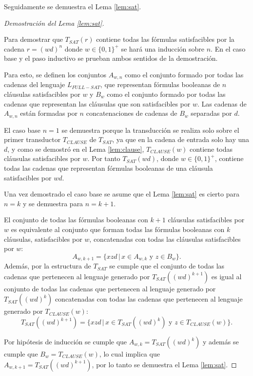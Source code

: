 \documentclass[12pt]{article}
\begin{document}
Seguidamente se demuestra el Lema \ref{lem:sat}.

\begin{proof}[Demostración del Lema \ref{lem:sat}] \
    
    Para demostrar que $T_{SAT}(r)$ contiene todas las fórmulas satisfacibles por la cadena $r=(wd)^n$ donde $w\in\{0,1\}^+$ se hará una inducción sobre $n$. En el caso base y el paso inductivo
    se prueban ambos sentidos de la demostración.  
    
    Para esto, se definen los conjuntos $A_{w,n}$ como el conjunto formado por todas las cadenas del lenguaje $L_{FULL-SAT}$, que representan fórmulas booleanas de $n$ cláusulas satisfacibles por $w$ y $B_w$ como el conjunto formado por todas las cadenas que representan las cláusulas que son satisfacibles por $w$. Las cadenas de $A_{w,n}$ están formadas por $n$ concatenaciones de cadenas de $B_w$ separadas por $d$.
    
    El caso base $n=1$ se demuestra porque la transducción se realiza solo sobre el primer transductor $T_{CLAUSE}$ de $T_{SAT}$, ya que en la cadena de entrada solo hay una $d$, y como se demostró en el Lema \ref{lem:clause}, $T_{CLAUSE}(w)$ contiene todas cláusulas satisfacibles por $w$. Por tanto $T_{SAT}(wd)$, donde $w\in \{0,1\}^+$, contiene todas las cadenas que representan fórmulas booleanas de una cláusula satisfacibles por $wd$.
    
    Una vez demostrado el caso base se asume que el Lema \ref{lem:sat} es cierto para $n=k$ y se demuestra para $n=k+1$.
    
    El conjunto de todas las fórmulas booleanas con $k+1$ cláusulas satisfacibles por $w$ es equivalente al conjunto que forman todas las fórmulas booleanas con $k$ cláusulas, satisfacibles por $w$, concatenadas con todas las cláusulas satisfacibles por $w$: $$A_{w,k+1}=\{xzd\,|\,x\in A_{w,k} \text{ y } z\in B_w\}.$$ Además, por la estructura de $T_{SAT}$ se cumple que el conjunto de todas las cadenas que pertenecen al lenguaje generado por $T_{SAT}((wd)^{k+1})$ es igual al conjunto de todas las cadenas que pertenecen al lenguaje generado por $T_{SAT}((wd)^{k})$ concatenadas con todas las cadenas que pertenecen al lenguaje generado por $T_{CLAUSE}(w)$:
    $$T_{SAT}((wd)^{k+1})=\{xzd\,|\,x\in T_{SAT}((wd)^{k}) \text{ y } z\in T_{CLAUSE}(w)\}.$$
    
    Por hipótesis de inducción se cumple que $A_{w,k}=T_{SAT}((wd)^{k})$ y además se cumple que $B_w=T_{CLAUSE}(w)$, lo cual implica que $A_{w,k+1}=T_{SAT}((wd)^{k+1})$, por lo tanto se demuestra el Lema \ref{lem:sat}.
\end{proof}
\end{document}
